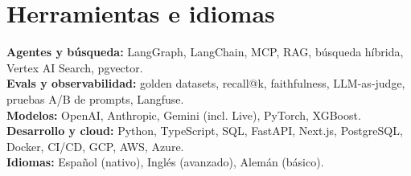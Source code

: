 \documentclass[a4paper,10pt]{article}
\begin{document}
\section*{Herramientas e idiomas}
\textbf{Agentes y búsqueda:} LangGraph, LangChain, MCP, RAG, búsqueda híbrida, Vertex AI Search, pgvector.\\
\textbf{Evals y observabilidad:} golden datasets, recall@k, faithfulness, LLM-as-judge, pruebas A/B de prompts, Langfuse.\\
\textbf{Modelos:} OpenAI, Anthropic, Gemini (incl. Live), PyTorch, XGBoost.\\
\textbf{Desarrollo y cloud:} Python, TypeScript, SQL, FastAPI, Next.js, PostgreSQL, Docker, CI/CD, GCP, AWS, Azure.\\
\textbf{Idiomas:} Español (nativo), Inglés (avanzado), Alemán (básico).
\end{document}
